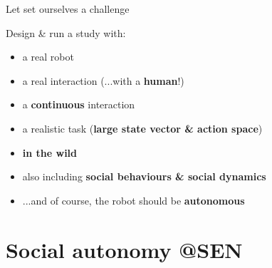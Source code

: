 \documentclass[xcolor=table]{beamer}
\begin{document}
\begin{frame}{Let set ourselves a challenge}

\begin{exampleblock}{Design \& run a study with:}
    
    \begin{itemize}
        \item<+-> a real robot
        \item<+-> a real interaction (...with a \textbf{human}!)
        \item<+-> a \textbf{continuous} interaction
        \item<+-> a realistic task (\textbf{large state vector \& action space})
        \item<+-> \textbf{in the wild}
        \item<+-> also including \textbf{social behaviours \& social dynamics}
        \item<+-> ...and of course, the robot should be \textbf{autonomous}
    \end{itemize}
\end{exampleblock}

\end{frame}

\section*{Social autonomy @SEN}

\end{document}

